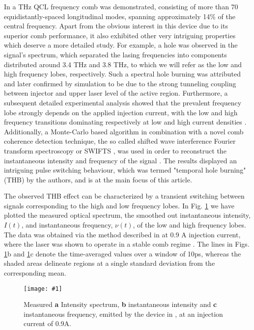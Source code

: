 \documentclass[]{spie}  %
\newcommand{\includegraphicsXL}[1]{\texttt{[image: \#1]}}
\begin{document}
In  a THz QCL frequency comb was demonstrated, consisting of more than 70 equidistantly-spaced longitudinal modes, spanning approximately 14\% of the central frequency. Apart from the obvious interest in this device due to its superior comb performance, it also exhibited other very intriguing properties which deserve a more detailed study. For example, a hole was observed in the signal's spectrum, which separated the lasing frequencies into components distributed around 3.4 THz and 3.8 THz, to which we will refer  as the low and high frequency lobes, respectively. Such a spectral hole burning was attributed and later confirmed by simulation \cite{petz2016} to be due to the strong tunneling coupling between injector and upper laser level of the active region. Furthermore, a subsequent detailed experimental analysis \cite{burghoff2015evaluating} showed that the prevalent frequency lobe strongly depends on the applied injection current, with the low and high frequency transitions dominating respectively at low and high current densities \cite{burghoff2015evaluating}. Additionally, a Monte-Carlo based algorithm in combination with a novel comb coherence detection technique, the so called shifted wave interference Fourier transform spectroscopy or SWIFTS \cite{burghoff2014broadband}, was used in order to reconstruct the instantaneous intensity and frequency of the signal \cite{burghoff2015evaluating}. The results displayed an intriguing pulse switching behaviour, which was termed "temporal hole burning" (THB) by the authors, and is at the main focus of this article. 

The observed THB effect can be characterized by a transient switching between signals corresponding to the high and low frequency lobes. In Fig. \ref{fig:exper_0p9A} we have plotted  the measured optical spectrum, the smoothed out instantaneous intensity, $I(t)$, and instantaneous frequency, $\nu(t)$, of the low and high frequency lobes. The data was obtained via the method described in  at 0.9 A injection current, where the laser was shown to operate in a stable comb regime \cite{burghoff2014terahertz}. The lines in Figs. \ref{fig:exper_0p9A}b and \ref{fig:exper_0p9A}c denote the time-averaged values over a window of 10ps, whereas the shaded areas delineate regions at a single standard deviation from the corresponding mean.  

\begin{figure}[h!]
	\begin{center}
		\includegraphicsXL{IMGS/exper_0p9A.eps}
		\caption{ Measured \textbf{a} Intensity spectrum, \textbf{b} instantaneous intensity and \textbf{c} instantaneous frequency, emitted by the device in , at an injection current of 0.9A.} \label{fig:exper_0p9A}
	\end{center}	
\end{figure}
\end{document}
